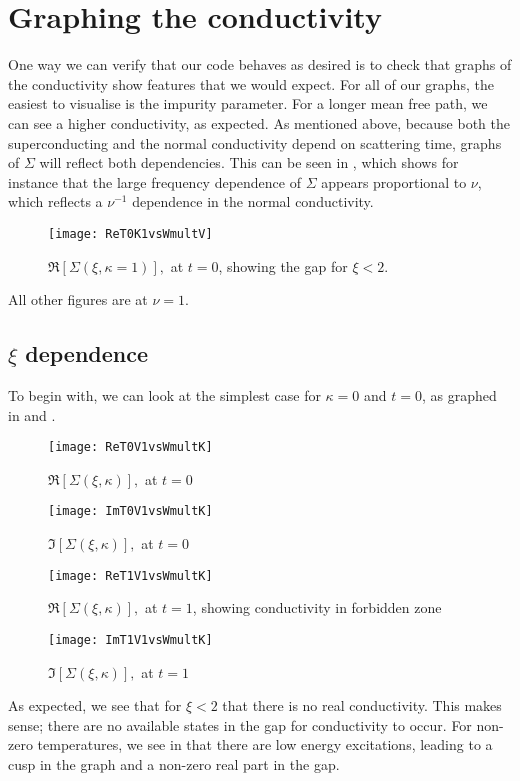 \documentclass[11pt]{article}
\begin{document}
\section{Graphing the conductivity} \label{sec:NamForm.Graph}

One way we can verify that our code behaves as desired is to check that graphs of the conductivity show features that we would expect.
For all of our graphs, the easiest to visualise is the impurity parameter.
For a longer mean free path, we can see a higher conductivity, as expected.
As mentioned above, because both the superconducting and the normal conductivity depend on scattering time, graphs of $\Sigma$ will reflect both dependencies.
This can be seen in , which shows for instance that the large frequency dependence of $\Sigma$ appears proportional to $\nu$, which reflects a $\nu^{-1}$ dependence in the normal conductivity.
\begin{figure}[htp]
	\centering
	\texttt{[image: ReT0K1vsWmultV]}
	\caption{$\Re[\Sigma(\xi, \kappa =1)],$ at $t = 0$, showing the gap for $\xi < 2$.} \label{fig:ReT0K1vsWmultV}
\end{figure}
All other figures are at $\nu = 1$.

\subsection{$\xi$ dependence} \label{subsec:NamForm.Graph.OmegaDep}
To begin with, we can look at the simplest case for $\kappa = 0$ and $t = 0$, as graphed in  and .
\begin{figure}[htp]
	\centering
	\texttt{[image: ReT0V1vsWmultK]}
	\caption{$\Re[\Sigma(\xi, \kappa)],$ at $t = 0$} \label{fig:ReT0V1vsWmultK}
\end{figure}
\begin{figure}[htp]
	\centering
	\texttt{[image: ImT0V1vsWmultK]}
	\caption{$\Im[\Sigma(\xi, \kappa)],$ at $t = 0$} \label{fig:ImT0V1vsWmultK}
\end{figure}
\begin{figure}[htp]
	\centering
	\texttt{[image: ReT1V1vsWmultK]}
	\caption{$\Re[\Sigma(\xi, \kappa)],$ at $t = 1$, showing conductivity in forbidden zone} \label{fig:ReT1V1vsWmultK}
\end{figure}
\begin{figure}[htp]
	\centering
	\texttt{[image: ImT1V1vsWmultK]}
	\caption{$\Im[\Sigma(\xi, \kappa)],$ at $t = 1$} \label{fig:ImT1V1vsWmultK}
\end{figure}
As expected, we see that for $\xi < 2$ that there is no real conductivity.
This makes sense;
there are no available states in the gap for conductivity to occur. 
For non-zero temperatures, we see in  that there are low energy excitations, leading to a cusp in the graph and a non-zero real part in the gap.
\end{document}
